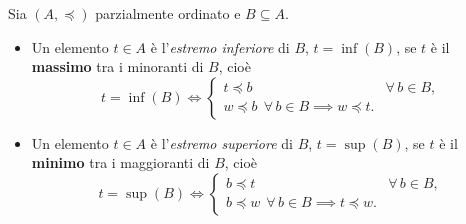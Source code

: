 \documentclass[11pt,a4paper]{article}
\theoremstyle{definition}
\begin{document}
\begin{definizione}
Sia $(A, \preceq)$ parzialmente ordinato e $B \subseteq A$.
\begin{itemize}
    \item Un elemento $t \in A$ è l'\emph{estremo inferiore} di $B$,
          $t = \inf(B)$, se $t$ è il \textbf{massimo} tra i minoranti di
          $B$, cioè
          \[
          t = \inf(B) \iff
          \begin{cases}
            t \preceq b & \forall\, b \in B, \\
            w \preceq b \ \ \forall\, b \in B \implies w \preceq t.
          \end{cases}
          \]
    \item Un elemento $t \in A$ è l'\emph{estremo superiore} di $B$,
          $t = \sup(B)$, se $t$ è il \textbf{minimo} tra i maggioranti di
          $B$, cioè
          \[
          t = \sup(B) \iff
          \begin{cases}
            b \preceq t & \forall\, b \in B, \\
            b \preceq w \ \ \forall\, b \in B \implies t \preceq w.
          \end{cases}
          \]
\end{itemize}
\end{definizione}
\end{document}
